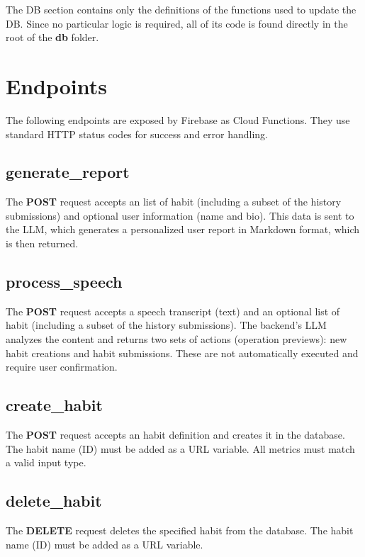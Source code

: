 \documentclass{article}
\newcommand{\newpar}[0]{\vspace{2mm}\noindent}
\begin{document}

\newpar
The DB section contains only the definitions of the functions used to update the DB.
Since no particular logic is required, all of its code is found directly in the root of the \textbf{db} folder.

\section{Endpoints}

The following endpoints are exposed by Firebase as Cloud Functions.
They use standard HTTP status codes for success and error handling.

\subsection{generate\_report}

The \textbf{POST} request accepts an list of habit (including a subset of the history submissions) and optional user information (name and bio).
This data is sent to the LLM, which generates a personalized user report in Markdown format, which is then returned.

\subsection{process\_speech}

The \textbf{POST} request accepts a speech transcript (text) and an optional list of habit (including a subset of the history submissions).
The backend's LLM analyzes the content and returns two sets of actions (operation previews): new habit creations and habit submissions.
These are not automatically executed and require user confirmation.

\subsection{create\_habit}

The \textbf{POST} request accepts an habit definition and creates it in the database.
The habit name (ID) must be added as a URL variable.
All metrics must match a valid input type.

\subsection{delete\_habit}

The \textbf{DELETE} request deletes the specified habit from the database.
The habit name (ID) must be added as a URL variable.
\end{document}
